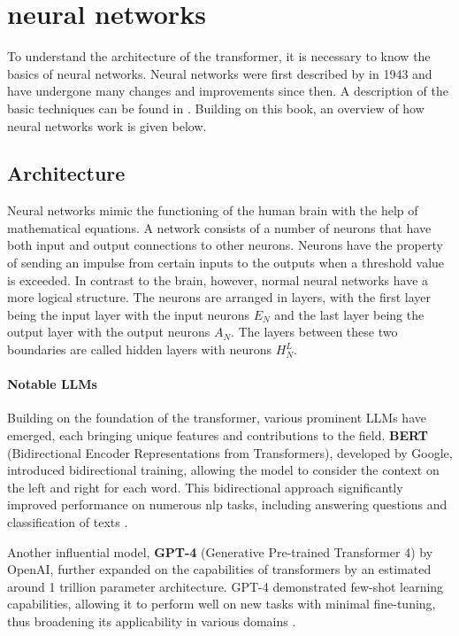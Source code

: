 \section{neural networks}\label{sec:neural-networks}
To understand the architecture of the transformer, it is necessary to know the basics of neural networks.
Neural networks were first described by \citet{neuronal_networks_first} in 1943 and have undergone many changes and improvements since then.
A description of the basic techniques can be found in \citet{neuronale-netze}.
Building on this book, an overview of how neural networks work is given below.

\subsection{Architecture}
Neural networks mimic the functioning of the human brain with the help of mathematical equations.
A network consists of a number of neurons that have both input and output connections to other neurons.
Neurons have the property of sending an impulse from certain inputs to the outputs when a threshold value is exceeded.
In contrast to the brain, however, normal neural networks have a more logical structure.
The neurons are arranged in layers, with the first layer being the input layer with the input neurons $E_N$ and the last layer being the output layer with the output neurons $A_N$.
The layers between these two boundaries are called hidden layers with neurons $H^L_N$.
%
\paragraph{Notable LLMs} Building on the foundation of the transformer, various prominent LLMs have emerged, each bringing unique features and contributions to the field. \textbf{BERT} (Bidirectional Encoder Representations from Transformers), developed by Google, introduced bidirectional training, allowing the model to consider the context on the left and right for each word. This bidirectional approach significantly improved performance on numerous \ac{nlp} tasks, including answering questions and classification of texts \citep{devlin2019bert}. 

Another influential model, \textbf{GPT-4} (Generative Pre-trained Transformer 4) by OpenAI, further expanded on the capabilities of transformers by an estimated around 1 trillion parameter architecture. GPT-4 demonstrated few-shot learning capabilities, allowing it to perform well on new tasks with minimal fine-tuning, thus broadening its applicability in various domains \citep{brown2020gpt3}. 

